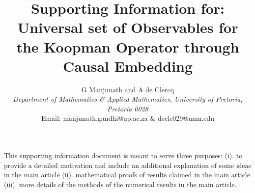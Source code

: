\documentclass[12 pt]{article}
\begin{document}
\title{Supporting Information for: Universal set of Observables for the Koopman Operator through Causal Embedding}
\author{G Manjunath and A de Clercq\\
{\small \it Department of Mathematics \& Applied Mathematics, University of Pretoria, Pretoria 0028} \\ {\small Email: manjunath.gandhi@up.ac.za \& decle029@umn.edu} \\}
\date{}
\date{}
\maketitle




This supporting information document is meant to serve three purposes: (i). to provide a detailed motivation and include an additional explanation of some ideas in the main article (ii). mathematical proofs of results claimed in the main article (iii). more details of the methods of the numerical results in the main article.  
\end{document}
